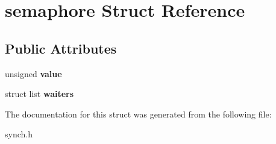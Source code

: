 \hypertarget{structsemaphore}{}\section{semaphore Struct Reference}
\label{structsemaphore}
\subsection*{Public Attributes}
\begin{DoxyCompactItemize}
\item 
unsigned {\bfseries value}\hypertarget{structsemaphore_a0b69d8b576949ef9277c3231e09fd3c6}{}\label{structsemaphore_a0b69d8b576949ef9277c3231e09fd3c6}

\item 
struct list {\bfseries waiters}\hypertarget{structsemaphore_a256e316ba2f3f9b59497f109cf0daee5}{}\label{structsemaphore_a256e316ba2f3f9b59497f109cf0daee5}

\end{DoxyCompactItemize}


The documentation for this struct was generated from the following file\+:\begin{DoxyCompactItemize}
\item 
synch.\+h\end{DoxyCompactItemize}

